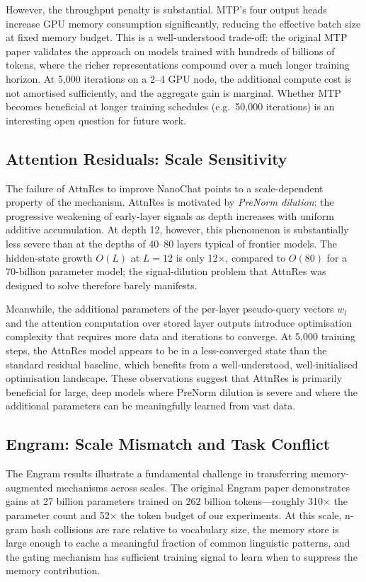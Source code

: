 However, the throughput penalty is substantial.
MTP's four output heads increase GPU memory consumption significantly, reducing the effective
batch size at fixed memory budget.
This is a well-understood trade-off: the original MTP paper validates the approach on models
trained with hundreds of billions of tokens, where the richer representations compound over a
much longer training horizon.
At 5{,}000 iterations on a 2--4 GPU node, the additional compute cost is not amortised
sufficiently, and the aggregate gain is marginal.
Whether MTP becomes beneficial at longer training schedules (e.g.\ 50{,}000 iterations) is an
interesting open question for future work.

\subsection{Attention Residuals: Scale Sensitivity}

The failure of AttnRes to improve NanoChat points to a scale-dependent property of the mechanism.
AttnRes is motivated by \emph{PreNorm dilution}: the progressive weakening of early-layer signals
as depth increases with uniform additive accumulation.
At depth 12, however, this phenomenon is substantially less severe than at the depths of 40--80
layers typical of frontier models.
The hidden-state growth $O(L)$ at $L=12$ is only 12$\times$, compared to $O(80)$ for a
70-billion parameter model; the signal-dilution problem that AttnRes was designed to solve
therefore barely manifests.

Meanwhile, the additional parameters of the per-layer pseudo-query vectors $w_l$ and the
attention computation over stored layer outputs introduce optimisation complexity that requires
more data and iterations to converge.
At 5{,}000 training steps, the AttnRes model appears to be in a less-converged state than the
standard residual baseline, which benefits from a well-understood, well-initialised optimisation
landscape.
These observations suggest that AttnRes is primarily beneficial for large, deep models where
PreNorm dilution is severe and where the additional parameters can be meaningfully learned from
vast data.

\subsection{Engram: Scale Mismatch and Task Conflict}

The Engram results illustrate a fundamental challenge in transferring memory-augmented mechanisms
across scales.
The original Engram paper \parencite{cheng2026conditional} demonstrates gains at 27 billion
parameters trained on 262 billion tokens---roughly 310$\times$ the parameter count and
52$\times$ the token budget of our experiments.
At this scale, n-gram hash collisions are rare relative to vocabulary size, the memory store is
large enough to cache a meaningful fraction of common linguistic patterns, and the gating
mechanism has sufficient training signal to learn when to suppress the memory contribution.

